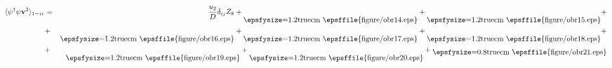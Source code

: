 \documentclass[12pt]{article}
\newcommand{\psid}{\psi^{\dagger}}
\begin{document}
\begin{eqnarray}  
  \langle \psid \psi {\mathbf v}^2 \rangle_{1-ir} &=& \frac{u_2}{D} \delta_{ij} Z_8 + 
  \raisebox{-2.5ex}{\epsfysize=1.2truecm \epsffile{figure/obr14.eps}} + 
  \raisebox{-2.5ex}{\epsfysize=1.2truecm \epsffile{figure/obr15.eps}} + \nonumber \\
  &+& \raisebox{-2.5ex}{\epsfysize=1.2truecm \epsffile{figure/obr16.eps}} +
  \raisebox{-2.5ex}{\epsfysize=1.2truecm \epsffile{figure/obr17.eps}} +
  \raisebox{-2.5ex}{\epsfysize=1.2truecm \epsffile{figure/obr18.eps}} + \nonumber \\
  &+& \raisebox{-2.5ex}{\epsfysize=1.2truecm \epsffile{figure/obr19.eps}} +
  \raisebox{-2.5ex}{\epsfysize=1.2truecm \epsffile{figure/obr20.eps}} + 
  \raisebox{-0.7ex}{\epsfysize=0.8truecm \epsffile{figure/obr21.eps}} \nonumber 
\end{eqnarray}


\newpage
\end{document}
